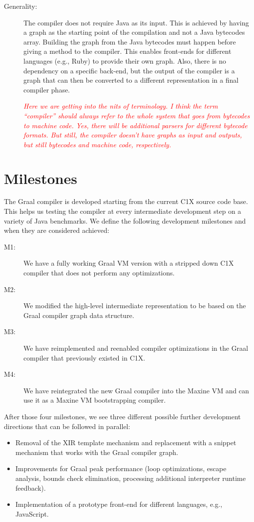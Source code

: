 \documentclass[twocolumn]{svjour3}
\newcommand{\mynote}[2]{
\textcolor{red}{\fbox{\bfseries\sffamily\scriptsize#1}
  {\small\textsf{\emph{#2}}}
\fbox{\bfseries\sffamily\scriptsize }}}
\newcommand\cw[1]{\mynote{CW}{#1}}
\begin{document}
\begin{description}
\item[Generality:]
The compiler does not require Java as its input.
This is achieved by having a graph as the starting point of the compilation and not a Java bytecodes array.
Building the graph from the Java bytecodes must happen before giving a method to the compiler.
This enables front-ends for different languages (e.g., Ruby) to provide their own graph.
Also, there is no dependency on a specific back-end, but the output of the compiler is a graph that can then be converted to a different representation in a final compiler phase.
\cw{Here we are getting into the nits of terminology.  I think the term ``compiler'' should always refer to the whole system that goes from bytecodes to machine code.  Yes, there will be additional parsers for different bytecode formats.  But still, the compiler doesn't have graphs as input and outputs, but still bytecodes and machine code, respectively.}
\end{description}

\section{Milestones}
The Graal compiler is developed starting from the current C1X source code base.
This helps us testing the compiler at every intermediate development step on a variety of Java benchmarks.
We define the following development milestones and when they are considered achieved:
\begin{description}
\item[M1:] We have a fully working Graal VM version with a stripped down C1X compiler that does not perform any optimizations.
\item[M2:] We modified the high-level intermediate representation to be based on the Graal compiler graph data structure.
\item[M3:] We have reimplemented and reenabled compiler optimizations in the Graal compiler that previously existed in C1X.
\item[M4:] We have reintegrated the new Graal compiler into the Maxine VM and can use it as a Maxine VM bootstrapping compiler.
\end{description}

After those four milestones, we see three different possible further development directions that can be followed in parallel:
\begin{itemize}
  \item Removal of the XIR template mechanism and replacement with a snippet mechanism that works with the Graal compiler graph.
  \item Improvements for Graal peak performance (loop optimizations, escape analysis, bounds check elimination, processing additional interpreter runtime feedback).
  \item Implementation of a prototype front-end for different languages, e.g., JavaScript.
\end{itemize}
\end{document}

